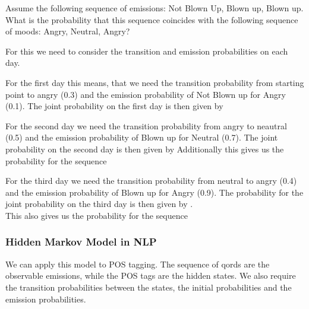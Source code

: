 \documentclass[
../../NLP4W_Summary.tex,
]
{subfiles}
\begin{document}
Assume the following sequence of emissions: Not Blown Up, Blown up, Blown up. What is the probability that this sequence coincides with the following sequence of moods: Angry, Neutral, Angry?

For this we need to consider the transition and emission probabilities on each day. 

For the first day this means, that we need the transition probability from starting point to angry (0.3) and the emission probability of Not Blown up for Angry (0.1). The joint probability on the first day is then given by 

For the second day we need the transition probability from angry to neautral (0.5) and the emission probability of Blown up for Neutral (0.7). The joint probability on the second day is then given by  Additionally this gives us the probability for the sequence 

For the third day we need the transition probability from neutral to angry (0.4) and the emission probability of Blown up for Angry (0.9). The probability for the joint probability on the third day is then given by . \\This also gives us the probability for the sequence 

\subsubsection{Hidden Markov Model in NLP}
We can apply this model to POS tagging. The sequence of qords are the observable emissions, while the POS tags are the hidden states. 
We also require the transition probabilities between the states, the initial probabilities and the emission probabilities. 
\end{document}
